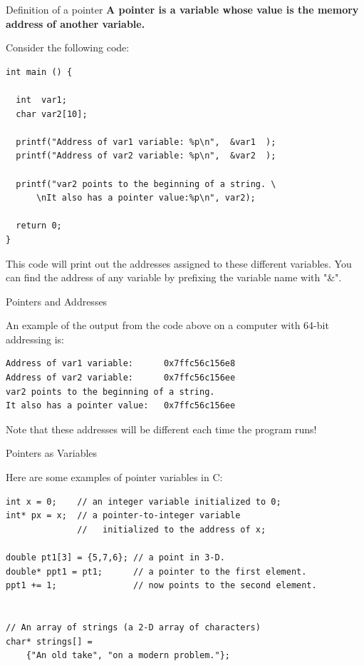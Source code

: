\documentclass[10pt]{beamer}
\begin{document}
\begin{frame}[fragile]{Definition of a pointer}
\textbf{A pointer is a variable whose value is the memory address of another variable.}

Consider the following code:
\fontsize{8pt}{8pt}
\selectfont
\begin{verbatim}
int main () {

  int  var1;
  char var2[10];

  printf("Address of var1 variable: %p\n",  &var1  );
  printf("Address of var2 variable: %p\n",  &var2  );

  printf("var2 points to the beginning of a string. \
      \nIt also has a pointer value:%p\n", var2);

  return 0;
}
\end{verbatim}
This code will print out the addresses assigned to these different variables.  You can find the address of any variable by prefixing the variable name with "\&".



\end{frame}
\begin{frame}[fragile]{Pointers and Addresses}

An example of the output from the code above on a computer with 64-bit addressing is:

\begin{verbatim}
Address of var1 variable:      0x7ffc56c156e8
Address of var2 variable:      0x7ffc56c156ee
var2 points to the beginning of a string.       
It also has a pointer value:   0x7ffc56c156ee
\end{verbatim}

Note that these addresses will be different each time the program runs!
   
\end{frame}
\begin{frame}[fragile]{Pointers as Variables}

Here are some examples of pointer variables in C:

\begin{verbatim}
int x = 0;    // an integer variable initialized to 0;
int* px = x;  // a pointer-to-integer variable 
              //   initialized to the address of x;

double pt1[3] = {5,7,6}; // a point in 3-D.
double* ppt1 = pt1;      // a pointer to the first element.
ppt1 += 1;               // now points to the second element.


// An array of strings (a 2-D array of characters)
char* strings[] = 
	{"An old take", "on a modern problem."};

\end{verbatim}

\end{frame}
\end{document}
